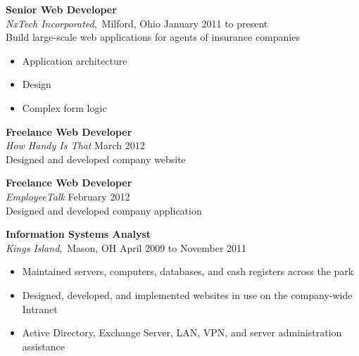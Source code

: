 \documentclass[11pt, line]{res}
\begin{document}
\begin{resume}
				\textbf{Senior Web Developer} \\
				\textit{NxTech Incorporated},\, Milford, Ohio
					\hfill January 2011 to present \\
				Build large-scale web applications for agents of insurance companies

				\begin{itemize}
					\item Application architecture
					\item Design
					\item Complex form logic
				\end{itemize}

				\textbf{Freelance Web Developer} \\
				\textit{How Handy Is That}
					\hfill March 2012 \\
				Designed and developed company website

				\textbf{Freelance Web Developer} \\
				\textit{EmployeeTalk}
					\hfill February 2012 \\
				Designed and developed company application

				\textbf{Information Systems Analyst} \\
				\textit{Kings Island},\, Mason, OH
					\hfill April 2009 to November 2011

				\begin{itemize}
					\item Maintained servers, computers, databases, and cash registers across the park
					\item Designed, developed, and implemented websites in use on the company-wide Intranet
					\item Active Directory, Exchange Server, LAN, VPN, and server administration assistance
				\end{itemize}
	\end{resume}
\end{document}

